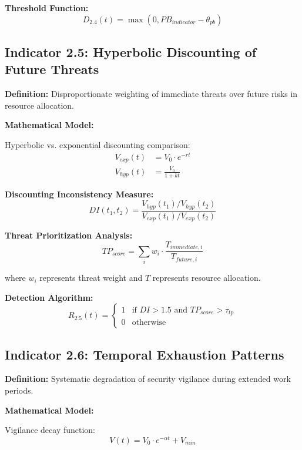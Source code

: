 \documentclass[11pt,a4paper]{article}
\begin{document}
\textbf{Threshold Function:}
\begin{equation}
D_{2.4}(t) = \max(0, PB_{indicator} - \theta_{pb})
\end{equation}

\subsection{Indicator 2.5: Hyperbolic Discounting of Future Threats}

\textbf{Definition:} Disproportionate weighting of immediate threats over future risks in resource allocation.

\textbf{Mathematical Model:}

Hyperbolic vs. exponential discounting comparison:
\begin{align}
V_{exp}(t) &= V_0 \cdot e^{-rt} \\
V_{hyp}(t) &= \frac{V_0}{1 + kt}
\end{align}

\textbf{Discounting Inconsistency Measure:}
\begin{equation}
DI(t_1, t_2) = \frac{V_{hyp}(t_1)/V_{hyp}(t_2)}{V_{exp}(t_1)/V_{exp}(t_2)}
\end{equation}

\textbf{Threat Prioritization Analysis:}
\begin{equation}
TP_{score} = \sum_{i} w_i \cdot \frac{T_{immediate,i}}{T_{future,i}}
\end{equation}

where $w_i$ represents threat weight and $T$ represents resource allocation.

\textbf{Detection Algorithm:}
\begin{equation}
R_{2.5}(t) = \begin{cases}
1 & \text{if } DI > 1.5 \text{ and } TP_{score} > \tau_{tp} \\
0 & \text{otherwise}
\end{cases}
\end{equation}

\subsection{Indicator 2.6: Temporal Exhaustion Patterns}

\textbf{Definition:} Systematic degradation of security vigilance during extended work periods.

\textbf{Mathematical Model:}

Vigilance decay function:
\begin{equation}
V(t) = V_0 \cdot e^{-\alpha t} + V_{min}
\end{equation}
\end{document}
